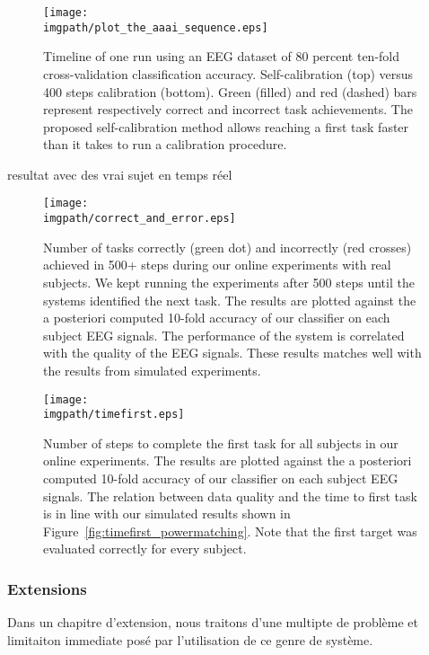 
\begin{figure}[!htbp]
\centering
\texttt{[image: \\imgpath/plot\_the\_aaai\_sequence.eps]}
\caption{Timeline of one run using an EEG dataset of $80$ percent ten-fold cross-validation classification accuracy. Self-calibration (top) versus 400 steps calibration (bottom). Green (filled) and red (dashed) bars represent respectively correct and incorrect task achievements. The proposed self-calibration method allows reaching a first task faster than it takes to run a calibration procedure.}
\label{fig:sequence}
\end{figure} 


resultat avec des vrai sujet en temps réel

\begin{figure}[!htbp]
\centering
\texttt{[image: \\imgpath/correct\_and\_error.eps]}
\caption{Number of tasks correctly (green dot) and incorrectly (red crosses) achieved in 500+ steps during our online experiments with real subjects. We kept running the experiments after 500 steps until the systems identified the next task. The results are plotted against the a posteriori computed 10-fold accuracy of our classifier on each subject EEG signals. The performance of the system is correlated with the quality of the EEG signals. These results matches well with the results from simulated experiments.}
\label{fig:correcterror_online}
\end{figure} 


\begin{figure}[!htbp]
\centering
\texttt{[image: \\imgpath/timefirst.eps]}
\caption{Number of steps to complete the first task for all subjects in our online experiments. The results are plotted against the a posteriori computed 10-fold accuracy of our classifier on each subject EEG signals. The relation between data quality and the time to first task is in line with our simulated results shown in Figure~\ref{fig:timefirst_powermatching}. Note that the first target was evaluated correctly for every subject.}
\label{fig:timefirst_online}
\end{figure}

\subsubsection*{Extensions}

Dans un chapitre d'extension, nous traitons d'une multipte de problème et limitaiton immediate posé par l'utilisation de ce genre de système.

